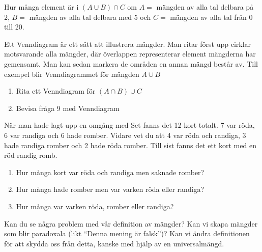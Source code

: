 \begin{problem}[Extra]
	Hur många element är i \((A \cup B) \cap C\) om \(A =\) mängden av alla tal delbara på 2, \(B = \) mängden av alla tal delbara med 5 och \(C =\) mängden av alla tal från 0 till 20.
\end{problem}

\begin{problem}[Extra]
	Ett Venndiagram är ett sätt att illustrera mängder. Man ritar först upp cirklar motsvarande alla mängder, där överlappen representerar element mängderna har gemensamt. Man kan sedan markera de områden en annan mängd består av. Till exempel blir Venndiagrammet för mängden \(A \cup B\) 
	\def\firstcircle{(0,0) circle (1.5cm)}
	\def\secondcircle{(60:2cm) circle (1.5cm)}
	\def\thirdcircle{(0:2cm) circle (1.5cm)}
	\begin{center}
	\end{center}

	\noindent
	\begin{enumerate}[label=\alph*)]
		\item Rita ett Venndiagram för \((A \cap B) \cup C \)
		\item Bevisa fråga 9 med Venndiagram
	\end{enumerate}
\end{problem}

\begin{problem}
	När man hade lagt upp en omgång med Set fanns det 12 kort totalt. 7 var röda, 6 var randiga och 6 hade romber. Vidare vet du att 4 var röda och randiga, 3 hade randiga romber och 2 hade röda romber. Till sist fanns det ett kort med en röd randig romb.
	\begin{enumerate}[label=\alph*)]
		\item Hur många kort var röda och randiga men saknade romber?
		\item Hur många hade romber men var varken röda eller randiga?
		\item Hur många var varken röda, romber eller randiga?
	\end{enumerate}
\end{problem}

\begin{problem}
	Kan du se några problem med vår definition av mängder? Kan vi skapa mängder som blir paradoxala (likt ``Denna mening är falsk'')? Kan vi ändra definitionen för att skydda oss från detta, kanske med hjälp av en universalmängd.
\end{problem}

